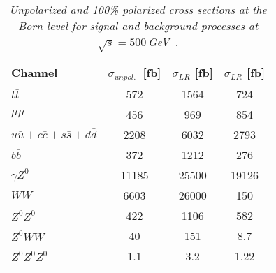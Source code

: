         \begin{table}[H]
        \begin{center}
        \begin{tabular}{l c c c}
        \hline
	Channel & $\sigma_{unpol.}$\ [fb] & $\sigma_{LR}$ [fb] &  $\sigma_{LR}$ [fb] \\
	\hline
	$t\bar{t}$ & 572 & 1564 & 724 \\
	\hline
	$\mu\mu$ & 456 & 969 & 854 \\
	$u\bar{u} + c\bar{c} + s\bar{s} + d\bar{d}$ & 2208 & 6032 & 2793 \\
	$b\bar{b}$ & 372 & 1212 & 276 \\
	$\gamma Z^0$ & 11185 & 25500 & 19126 \\
	$WW$ & 6603 & 26000 & 150 \\ 
	$Z^0Z^0$ & 422 & 1106 & 582 \\
	$Z^0WW$ & 40 & 151 & 8.7 \\
	$Z^0 Z^0 Z^0$ & 1.1 & 3.2 & 1.22 \\
        \hline
        \end{tabular}
        \end{center}
        \caption{\sl Unpolarized and 100\% polarized cross sections at the Born level for signal and background processes at $\sqrt{s}=500$\,GeV~\cite{bib:ILCTOP}. }
        \label{table:ttbarsigma}
        \end{table}
